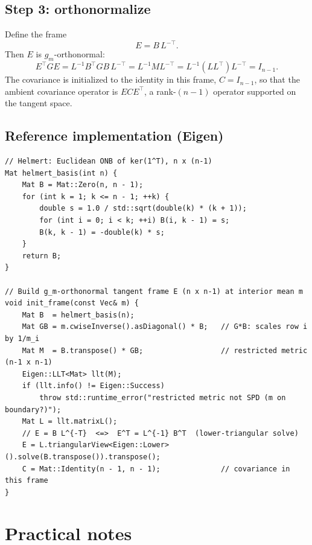 \documentclass[11pt]{article}
\begin{document}
\subsection*{Step 3: orthonormalize}

Define the frame
\begin{equation}
  E = B\, L^{-\top}.
  \label{eq:frame}
\end{equation}
Then $E$ is $g_m$-orthonormal:
\begin{equation}
  E^\top G E
    = L^{-1} B^\top G B\, L^{-\top}
    = L^{-1} M L^{-\top}
    = L^{-1} (L L^\top) L^{-\top}
    = I_{n-1}.
\end{equation}
The covariance is initialized to the identity in this frame,
$C = I_{n-1}$, so that the ambient covariance operator is $E C E^\top$, a
rank-$(n-1)$ operator supported on the tangent space.

\subsection*{Reference implementation (Eigen)}

\begin{lstlisting}
// Helmert: Euclidean ONB of ker(1^T), n x (n-1)
Mat helmert_basis(int n) {
    Mat B = Mat::Zero(n, n - 1);
    for (int k = 1; k <= n - 1; ++k) {
        double s = 1.0 / std::sqrt(double(k) * (k + 1));
        for (int i = 0; i < k; ++i) B(i, k - 1) = s;
        B(k, k - 1) = -double(k) * s;
    }
    return B;
}

// Build g_m-orthonormal tangent frame E (n x n-1) at interior mean m
void init_frame(const Vec& m) {
    Mat B  = helmert_basis(n);
    Mat GB = m.cwiseInverse().asDiagonal() * B;   // G*B: scales row i by 1/m_i
    Mat M  = B.transpose() * GB;                  // restricted metric (n-1 x n-1)
    Eigen::LLT<Mat> llt(M);
    if (llt.info() != Eigen::Success)
        throw std::runtime_error("restricted metric not SPD (m on boundary?)");
    Mat L = llt.matrixL();
    // E = B L^{-T}  <=>  E^T = L^{-1} B^T  (lower-triangular solve)
    E = L.triangularView<Eigen::Lower>().solve(B.transpose()).transpose();
    C = Mat::Identity(n - 1, n - 1);              // covariance in this frame
}
\end{lstlisting}

\section{Practical notes}
\end{document}
